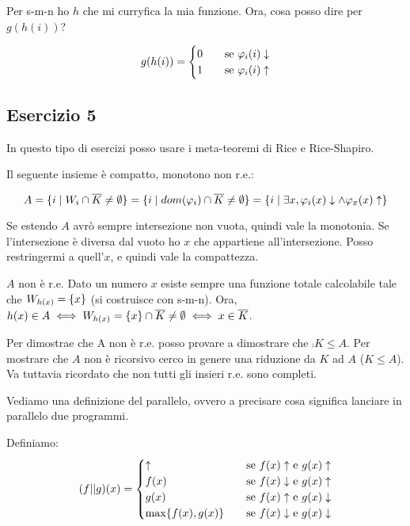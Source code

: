 Per s-m-n ho $h$ che mi curryfica la mia funzione. Ora, cosa posso dire per $g(h(i))$?

\begin{equation*}
    g(h(i)) =
    \begin{cases}
        0 \quad &\text{se $\varphi_{i}(i) \downarrow$}\\
        1 \quad &\text{se $\varphi_{i}(i) \uparrow$}\\
    \end{cases}
\end{equation*}

\subsection{Esercizio 5}

In questo tipo di esercizi posso usare i meta-teoremi di Rice e Rice-Shapiro.

Il seguente insieme è compatto, monotono non r.e.:

\begin{equation*}
    A = \{ i \mid W_{i} \cap \overline{K} \not= \emptyset\} = \{ i \mid dom(\varphi_{i}) \cap \overline{K}
    \not= \emptyset \} = \{ i \mid \exists x, \varphi_{i}(x) \downarrow \land \varphi_{x}(x) \uparrow\}
\end{equation*}

Se estendo $A$ avrò sempre intersezione non vuota, quindi vale la monotonia. Se l'intersezione è diversa dal vuoto
ho $x$ che appartiene all'intersezione. Posso restringermi a quell'$x$, e quindi vale la compattezza.

$A$ non è r.e. Dato un numero $x$ esiste sempre una funzione totale calcolabile tale che $W_{h(x)}
= \{x\}$ (si costruisce con s-m-n). Ora, $h(x) \in A \iff W_{h(x)} = \{x\} \cap \overline{K} \not=
\emptyset \iff x \in \overline{K}$.

Per dimostrae che A non è r.e. posso provare a dimostrare che $\comp{K} \leq A$. Per mostrare
che $A$ non è ricorsivo cerco in genere una riduzione da $K$ ad $A$ ($K \leq A$). Va tuttavia
ricordato che non tutti gli insieri r.e. sono completi.

Vediamo una definizione del parallelo, ovvero a precisare cosa significa lanciare in parallelo due
programmi.

Definiamo:
\begin{equation*}
    (f || g)(x) =
    \begin{cases}
        \uparrow \quad &\text{se $f(x) \uparrow$ e $g(x) \uparrow$} \\
        f(x) \quad &\text{se $f(x) \downarrow$ e $g(x) \uparrow$} \\
        g(x) \quad &\text{se $f(x) \uparrow$ e $g(x) \downarrow$} \\
        \max\{f(x),g(x)\} \quad &\text{se $f(x) \downarrow$ e $g(x) \downarrow$}
    \end{cases}
\end{equation*}

